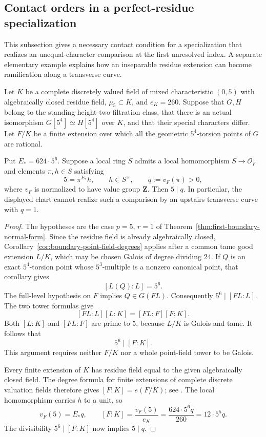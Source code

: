 \subsection{Contact orders in a perfect-residue specialization}
\label{subsec:boundary-specialization-contact}

This subsection gives a necessary contact condition for a specialization
that realizes an unequal-character comparison at the first unresolved
index.  A separate elementary example explains how an inseparable
residue extension can become ramification along a transverse curve.

\begin{proposition}
\label{prop:boundary-specialization-contact}
Let $K$ be a complete discretely valued field of mixed characteristic
$(0,5)$ with algebraically closed residue field, $\mu _5\subset K$, and
$e_K=260$.  Suppose that $G,H$ belong to the standing height-two
filtration class, that there is an actual isomorphism
$G[5^4]\simeq H[5^4]$ over $K$, and that their special characters differ.
Let $F/K$ be a finite extension over which all the geometric
$5^4$-torsion points of $G$ are rational.

Put $E_*=624\cdot5^6$.  Suppose a local ring $S$ admits a local
homomorphism $S\to\mathcal O_F$ and elements $\pi,h\in S$ satisfying
\[
  5=\pi^{E_*}h,\qquad h\in S^\times,
  \qquad q:=v_F(\pi)>0,
\]
where $v_F$ is normalized to have value group $\mathbf Z$.
Then $5\mid q$.  In particular, the displayed chart cannot realize such
a comparison by an upstairs transverse curve with $q=1$.
\end{proposition}

\begin{proof}
The hypotheses are the case $p=5$, $r=1$ of
Theorem~\ref{thm:first-boundary-normal-form}.  Since the residue field is
already algebraically closed, Corollary~\ref{cor:boundary-point-field-degrees}
applies after a common tame good extension $L/K$, which may be chosen
Galois of degree dividing $24$.  If $Q$ is an exact $5^4$-torsion point
whose $5^3$-multiple is a nonzero canonical point, that corollary gives
\[
  [L(Q):L]=5^6.
\]
The full-level hypothesis on $F$ implies $Q\in G(FL)$.  Consequently
$5^6\mid[FL:L]$.  The two tower formulas give
\[
  [FL:L][L:K]=[FL:F][F:K].
\]
Both $[L:K]$ and $[FL:F]$ are prime to $5$, because $L/K$ is Galois
and tame.  It follows that
\[
  5^6\mid[F:K].
\]
This argument requires neither $F/K$ nor a whole point-field tower
to be Galois.

Every finite extension of $K$ has residue field equal to the given
algebraically closed field.  The degree formula for finite extensions
of complete discrete valuation fields therefore gives
$[F:K]=e(F/K)$; see
\citet[Section~15.113, Remark~15.113.6]{StacksDVR}.
The local homomorphism carries $h$ to a unit, so
\[
  v_F(5)=E_*q,
  \qquad
  [F:K]=\frac{v_F(5)}{e_K}
       =\frac{624\cdot5^6q}{260}
       =12\cdot5^5q.
\]
The divisibility $5^6\mid[F:K]$ now implies $5\mid q$.
\end{proof}

